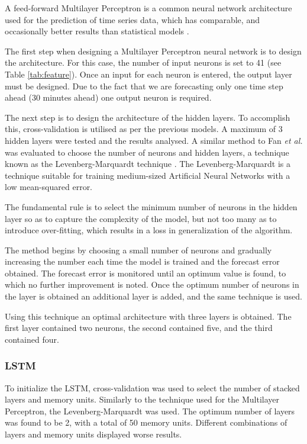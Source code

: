 A feed-forward Multilayer Perceptron is a common neural network architecture used for the prediction of time series data, which has comparable, and occasionally better results than statistical models \cite{Hill1994}. 

The first step when designing a Multilayer Perceptron neural network is to design the architecture. For this case, the number of input neurons is set to 41 (see Table \ref{tab:feature}). Once an input for each neuron is entered, the output layer must be designed. Due to the fact that we are forecasting only one time step ahead (30 minutes ahead) one output neuron is required.

The next step is to design the architecture of the hidden layers. To accomplish this, cross-validation is utilised as per the previous models. A maximum of 3 hidden layers were tested and the results analysed. A similar method to Fan \textit{et al.} was evaluated to choose the number of neurons and hidden layers, a technique known as the Levenberg-Marquardt technique \cite{Fan2009}. The Levenberg-Marquardt is a technique suitable for training medium-sized Artificial Neural Networks with a low mean-squared error. 

The fundamental rule is to select the minimum number of neurons in the hidden layer so as to capture the complexity of the model, but not too many as to introduce over-fitting, which results in a loss in generalization of the algorithm.

The method begins by choosing a small number of neurons and gradually increasing the number each time the model is trained and the forecast error obtained. The forecast error is monitored until an optimum value is found, to which no further improvement is noted. Once the optimum number of neurons in the layer is obtained an additional layer is added, and the same technique is used.

Using this technique an optimal architecture with three layers is obtained. The first layer contained two neurons, the second contained five, and the third contained four.



\subsubsection{LSTM}

To initialize the LSTM, cross-validation was used to select the number of stacked layers and memory units. Similarly to the technique used for the Multilayer Perceptron, the Levenberg-Marquardt was used. The optimum number of layers was found to be 2, with a total of 50 memory units. Different combinations of layers and memory units displayed worse results.



